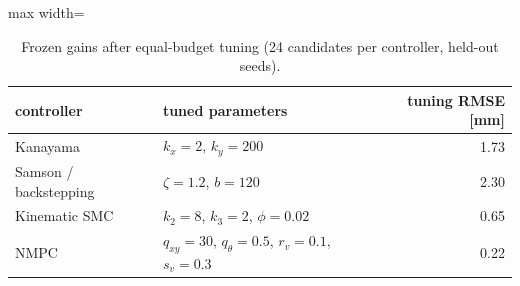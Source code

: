 \begin{table}[!htbp]
\centering\small
\caption{Frozen gains after equal-budget tuning (24 candidates per controller, held-out seeds).}\label{tab:gains}
\begin{adjustbox}{max width=\linewidth}
\begin{tabular}{llr}
\toprule
controller & tuned parameters & tuning RMSE [mm] \\
\midrule
Kanayama & $k_x=2$, $k_y=200$ & 1.73 \\
Samson / backstepping & $\zeta=1.2$, $b=120$ & 2.30 \\
Kinematic SMC & $k_2=8$, $k_3=2$, $\phi=0.02$ & 0.65 \\
NMPC & $q_{xy}=30$, $q_\theta=0.5$, $r_v=0.1$, $s_v=0.3$ & 0.22 \\
\bottomrule
\end{tabular}
\end{adjustbox}
\end{table}

